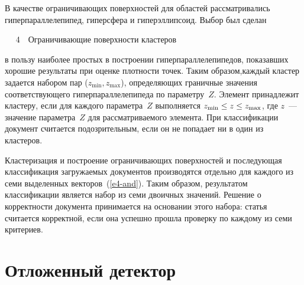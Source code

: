 \begin{multicols}{2}
  В качестве ограничивающих поверхностей для областей рассматривались 
гиперпараллелепипед, гиперсфера и гиперэллипсоид.  Выбор
 был сделан\linebreak\vspace*{-12pt}
\begin{center}  %
\vspace*{12pt}
\mbox{%
 \epsfxsize=78.877mm
 }
 \vspace*{6pt}
{{\figurename~4}\ \ \small{Ограничивающие поверхности кластеров}}

 \end{center}




\addtocounter{figure}{1}


\noindent
 в пользу наиболее простых в построении гиперпараллелепипедов, показавших 
хорошие результаты при оценке плотности точек. Таким образом,\linebreak каж\-дый 
кластер задается набором пар ($z_{\min}, z_{\max}$), определяющих 
граничные значения со\-от\-вет\-ст\-ву\-ющего гиперпараллелепипеда по 
па\-ра\-мет\-ру~$Z$. \mbox{Элемент} принадлежит кластеру, если для каж\-до\-го 
па\-ра\-мет\-ра~$Z$ выполняется $z_{\min}\hm\leq z\hm\leq z_{\max}$, где $z$~--- 
значение параметра~$Z$ для рассматриваемого элемента. При классификации 
документ считается подозрительным, если он не попадает ни в один из 
кластеров.
  
    Кластеризация и построение ограничивающих поверхностей и последующая 
классификация загружаемых документов производятся отдельно для каждого 
из семи выделенных векторов~(\ref{e4-and}). Таким образом, результатом 
классификации является набор из семи двоичных значений. Решение о 
корректности документа принимается на основании этого набора: статья 
считается корректной, если она успешно прошла проверку по каждому из семи 
критериев. 
  
\section{Отложенный детектор}
  

\end{multicols}
